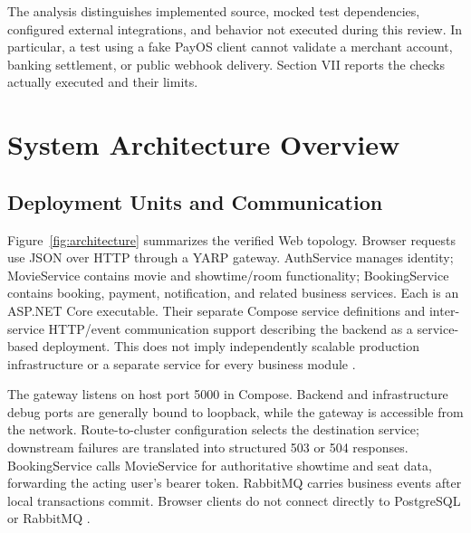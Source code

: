 \documentclass[conference]{IEEEtran}
\begin{document}
The analysis distinguishes implemented source, mocked test dependencies,
configured external integrations, and behavior not executed during this review.
In particular, a test using a fake PayOS client cannot validate a merchant
account, banking settlement, or public webhook delivery. Section VII reports
the checks actually executed and their limits.

\section{System Architecture Overview}
\subsection{Deployment Units and Communication}
Figure~\ref{fig:architecture} summarizes the verified Web topology. Browser
requests use JSON over HTTP through a YARP gateway. AuthService manages identity;
MovieService contains movie and showtime/room functionality; BookingService
contains booking, payment, notification, and related business services. Each is
an ASP.NET Core executable. Their separate Compose service definitions and
inter-service HTTP/event communication support describing the backend as a
service-based deployment. This does not imply independently scalable production
infrastructure or a separate service for every business module
\cite{gateway,movie,booking,deployment}.



The gateway listens on host port 5000 in Compose. Backend and infrastructure
debug ports are generally bound to loopback, while the gateway is accessible
from the network. Route-to-cluster configuration selects the destination
service; downstream failures are translated into structured 503 or 504 responses.
BookingService calls MovieService for authoritative showtime and seat data,
forwarding the acting user's bearer token. RabbitMQ carries business events
after local transactions commit. Browser clients do not connect directly to
PostgreSQL or RabbitMQ \cite{gateway,booking,deployment}.
\end{document}
